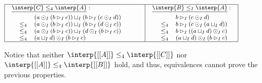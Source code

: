 \begin{example}
\begin{center}
  \begin{math}
    \footnotesize
    \begin{array}{|ll|l|}
      \hline
      \begin{array}{lll}
        \underline{\interp{C} \leq_4 \interp{A}}:\\[4px]
        \,\,\,\,\begin{array}{rl}
               & (a \odot_I (b \rhd_I c)) \sqcup_I (b \rhd_I (c \odot_I d))\\
        \leq_4 &  (a \odot_I (b \rhd_I c)) \sqcup_I (b \rhd_I (d \odot_I c))\\
        \leq_4 &  (a \odot_I (b \rhd_I c)) \sqcup_I (d \odot_I (b \rhd_I c))\\
        \leq_4 &  (a \sqcup_I d) \odot_I (b \rhd_I c)\\
        \end{array}
      \end{array}
      & \quad &
      \begin{array}{lll}
        \underline{\interp{B} \leq_I \interp{A}}:\\[4px]
        \,\,\,\,\,\begin{array}{lll}
               & b \rhd_I (c \odot_I d)\\
        \leq_4 &  b \rhd_I (c \odot_I (a \sqcup_I d))\\
        \leq_4 &  b \rhd_I ((a \sqcup_I d) \odot_I c)\\
        \leq_4 & (a \sqcup_I d) \odot_I (b \rhd_I c)\\
        \end{array}
      \end{array}\\
      \hline
    \end{array}
  \end{math}
\end{center}
Notice that neither $\interp{[[A]]} \leq_4 \interp{[[C]]}$ nor
$\interp{[[A]]} \leq_4 \interp{[[B]]}$ hold, and thus, equivalences
cannot prove the previous properties.
\end{example}
